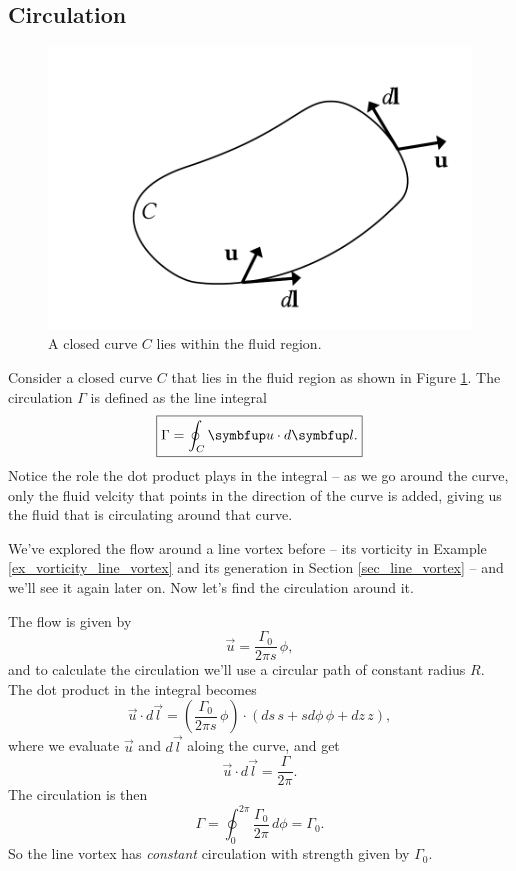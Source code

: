 \subsection{Circulation}
\label{sec_circulation}

\begin{figure}
\centering\includegraphics[width=0.5\linewidth]{Figures/Chapter3/fig_circ}
\caption{A closed curve $C$ lies within the fluid region.}
\label{fig_circ}
\end{figure}

Consider a closed curve $C$ that lies in the fluid region as shown in Figure \ref{fig_circ}.  The circulation $\Gamma$ is defined as the line integral
\begin{equation}
\boxed{
\Gamma = \oint_C \uu \cdot d\vec{l}.
}
\label{eq_circ}
\end{equation}
Notice the role the dot product plays in the integral -- as we go around the curve, only the fluid velcity that points in the direction of the curve is added, giving us the fluid that is circulating around that curve.

\begin{example}
We've explored the flow around a line vortex before -- its vorticity in Example \ref{ex_vorticity_line_vortex} and its generation in Section \ref{sec_line_vortex} -- and we'll see it again later on.  Now let's find the circulation around it.

The flow is given by
\[
\vec{u} = \frac{\Gamma_0}{2\pi s} \, \unit{\phi},
\]
and to calculate the circulation we'll use a circular path of constant radius $R$.  The dot product in the integral becomes
\[
\vec{u} \cdot d\vec{l} = \left( \frac{\Gamma_0}{2\pi s} \, \unit{\phi} \right) \cdot \left( ds \, \unit{s} + s d\phi \, \unit{\phi} + dz \, \unit{z} \right),
\]
where we evaluate $\vec{u}$ and $d\vec{l}$ aloing the curve, and get
\[
\vec{u} \cdot d\vec{l} = \frac{\Gamma}{2\pi}.
\]
The circulation is then
\[
\Gamma = \oint_0^{2\pi} \frac{\Gamma_0}{2\pi} \, d\phi = \Gamma_0.
\]
So the line vortex has \emph{constant} circulation with strength given by $\Gamma_0$.
\end{example}

